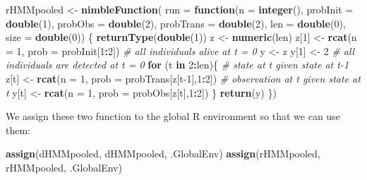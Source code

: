 \documentclass[
  12pt,
]{krantz}
\newenvironment{Shaded}{\begin{snugshade}}{\end{snugshade}}
\newcommand{\AttributeTok}[1]{\textcolor[rgb]{0.13,0.29,0.53}{#1}}
\newcommand{\CommentTok}[1]{\textcolor[rgb]{0.56,0.35,0.01}{\textit{#1}}}
\newcommand{\ControlFlowTok}[1]{\textcolor[rgb]{0.13,0.29,0.53}{\textbf{#1}}}
\newcommand{\DecValTok}[1]{\textcolor[rgb]{0.00,0.00,0.81}{#1}}
\newcommand{\FunctionTok}[1]{\textcolor[rgb]{0.13,0.29,0.53}{\textbf{#1}}}
\newcommand{\NormalTok}[1]{#1}
\newcommand{\OtherTok}[1]{\textcolor[rgb]{0.56,0.35,0.01}{#1}}
\newcommand{\SpecialCharTok}[1]{\textcolor[rgb]{0.81,0.36,0.00}{\textbf{#1}}}
\newcommand{\StringTok}[1]{\textcolor[rgb]{0.31,0.60,0.02}{#1}}
\begin{document}
\begin{Shaded}
\begin{Highlighting}[]
\NormalTok{rHMMpooled }\OtherTok{\textless{}{-}} \FunctionTok{nimbleFunction}\NormalTok{(}
  \AttributeTok{run =} \ControlFlowTok{function}\NormalTok{(}\AttributeTok{n =} \FunctionTok{integer}\NormalTok{(),}
                 \AttributeTok{probInit =} \FunctionTok{double}\NormalTok{(}\DecValTok{1}\NormalTok{),}
                 \AttributeTok{probObs =} \FunctionTok{double}\NormalTok{(}\DecValTok{2}\NormalTok{),}
                 \AttributeTok{probTrans =} \FunctionTok{double}\NormalTok{(}\DecValTok{2}\NormalTok{),}
                 \AttributeTok{len =} \FunctionTok{double}\NormalTok{(}\DecValTok{0}\NormalTok{),}
                 \AttributeTok{size =} \FunctionTok{double}\NormalTok{(}\DecValTok{0}\NormalTok{)) \{}
    \FunctionTok{returnType}\NormalTok{(}\FunctionTok{double}\NormalTok{(}\DecValTok{1}\NormalTok{))}
\NormalTok{    z }\OtherTok{\textless{}{-}} \FunctionTok{numeric}\NormalTok{(len)}
\NormalTok{    z[}\DecValTok{1}\NormalTok{] }\OtherTok{\textless{}{-}} \FunctionTok{rcat}\NormalTok{(}\AttributeTok{n =} \DecValTok{1}\NormalTok{, }\AttributeTok{prob =}\NormalTok{ probInit[}\DecValTok{1}\SpecialCharTok{:}\DecValTok{2}\NormalTok{]) }\CommentTok{\# all individuals alive at t = 0}
\NormalTok{    y }\OtherTok{\textless{}{-}}\NormalTok{ z}
\NormalTok{    y[}\DecValTok{1}\NormalTok{] }\OtherTok{\textless{}{-}} \DecValTok{2} \CommentTok{\# all individuals are detected at t = 0}
    \ControlFlowTok{for}\NormalTok{ (t }\ControlFlowTok{in} \DecValTok{2}\SpecialCharTok{:}\NormalTok{len)\{}
      \CommentTok{\# state at t given state at t{-}1}
\NormalTok{      z[t] }\OtherTok{\textless{}{-}} \FunctionTok{rcat}\NormalTok{(}\AttributeTok{n =} \DecValTok{1}\NormalTok{, }\AttributeTok{prob =}\NormalTok{ probTrans[z[t}\DecValTok{{-}1}\NormalTok{],}\DecValTok{1}\SpecialCharTok{:}\DecValTok{2}\NormalTok{]) }
      \CommentTok{\# observation at t given state at t}
\NormalTok{      y[t] }\OtherTok{\textless{}{-}} \FunctionTok{rcat}\NormalTok{(}\AttributeTok{n =} \DecValTok{1}\NormalTok{, }\AttributeTok{prob =}\NormalTok{ probObs[z[t],}\DecValTok{1}\SpecialCharTok{:}\DecValTok{2}\NormalTok{]) }
\NormalTok{    \}}
    \FunctionTok{return}\NormalTok{(y)}
\NormalTok{  \})}
\end{Highlighting}
\end{Shaded}

We assign these two function to the global R environment so that we can use them:

\begin{Shaded}
\begin{Highlighting}[]
\FunctionTok{assign}\NormalTok{(}\StringTok{\textquotesingle{}dHMMpooled\textquotesingle{}}\NormalTok{, dHMMpooled, .GlobalEnv)}
\FunctionTok{assign}\NormalTok{(}\StringTok{\textquotesingle{}rHMMpooled\textquotesingle{}}\NormalTok{, rHMMpooled, .GlobalEnv)}
\end{Highlighting}
\end{Shaded}
\end{document}
